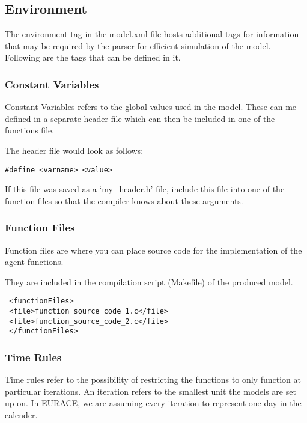 \subsection{Environment}
The environment tag in the model.xml file hosts additional tags for information that may be required by the parser for efficient simulation of the model.
Following are the tags that can be defined in it.


\subsubsection{Constant Variables}

Constant Variables refers to the global values used in the model. These can me defined in a separate header file which can then be included in one of the functions file.

The header file would look as follows:

\begin{mylisting}
\begin{verbatim}
#define <varname> <value>
\end{verbatim}
\end{mylisting}

If this file was saved as a `my\_header.h' file, include this file into one of
the function files so that the compiler knows about these arguments.

\subsubsection{Function Files}

Function files are where you can place source code for the implementation of the agent functions.

They are included in the compilation script (Makefile) of the produced model.

\begin{mylisting}
\begin{verbatim}
 <functionFiles>
 <file>function_source_code_1.c</file>
 <file>function_source_code_2.c</file>
 </functionFiles>
\end{verbatim}
\end{mylisting}

\subsubsection{Time Rules}

Time rules refer to the possibility of restricting the functions to only function at particular iterations. An iteration refers to the smallest unit the models are set up on. In EURACE, we are assuming every iteration to represent one day in the calender.

